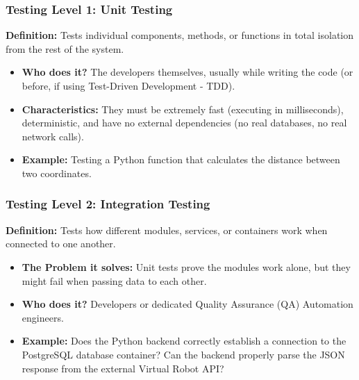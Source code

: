 \documentclass[xcolor=table]{beamer}
\begin{document}
\begin{frame}
    \frametitle{Testing Level 1: Unit Testing}
    \textbf{Definition:} Tests individual components, methods, or functions in total isolation from the rest of the system.
    
    \begin{itemize}
        \item \textbf{Who does it?} The developers themselves, usually while writing the code (or before, if using Test-Driven Development - TDD).
        \item \textbf{Characteristics:} They must be extremely fast (executing in milliseconds), deterministic, and have no external dependencies (no real databases, no real network calls).
        \item \textbf{Example:} Testing a Python function that calculates the distance between two coordinates.
    \end{itemize}
\end{frame}

\begin{frame}
    \frametitle{Testing Level 2: Integration Testing}
    \textbf{Definition:} Tests how different modules, services, or containers work when connected to one another.
    
    \begin{itemize}
        \item \textbf{The Problem it solves:} Unit tests prove the modules work alone, but they might fail when passing data to each other.
        \item \textbf{Who does it?} Developers or dedicated Quality Assurance (QA) Automation engineers.
        \item \textbf{Example:} Does the Python backend correctly establish a connection to the PostgreSQL database container? Can the backend properly parse the JSON response from the external Virtual Robot API?
    \end{itemize}
\end{frame}
\end{document}
